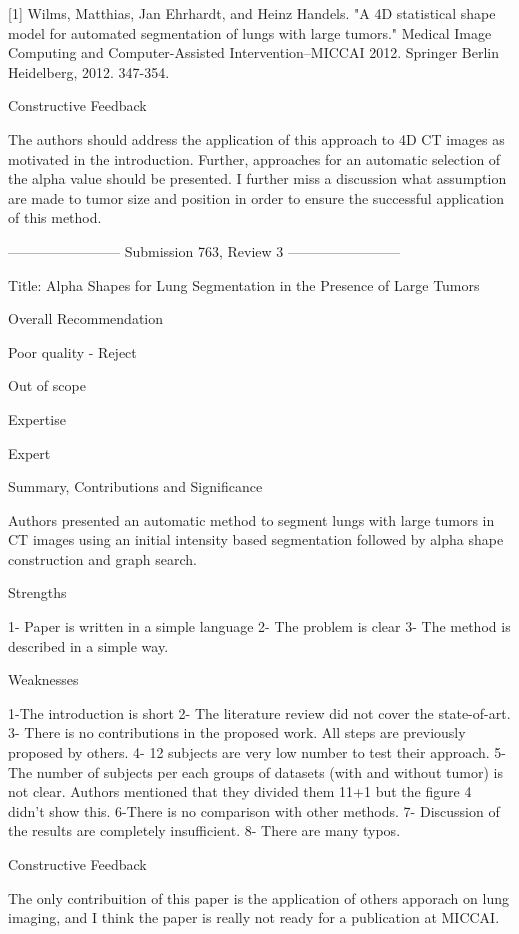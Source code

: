    [1] Wilms, Matthias, Jan Ehrhardt, and Heinz Handels. "A 4D statistical
   shape model for automated segmentation of lungs with large tumors."
   Medical Image Computing and Computer-Assisted Intervention–MICCAI 2012.
   Springer Berlin Heidelberg, 2012. 347-354.

Constructive Feedback

   The authors should address the application of this approach to 4D CT
   images as motivated in the introduction. Further, approaches for an
   automatic selection of the alpha value should be presented.
   I further miss a discussion what assumption are made to tumor size and
   position in order to ensure the successful application of this method.


------------------------ Submission 763, Review 3 ------------------------

Title: Alpha Shapes for Lung Segmentation in the Presence of Large Tumors


Overall Recommendation

   Poor quality - Reject

Out of scope


Expertise

   Expert

Summary, Contributions and Significance

   Authors presented an automatic method to segment lungs with
   large tumors in CT images using an initial intensity based segmentation
   followed by alpha shape construction and graph search.

Strengths

   1- Paper is written in a simple language
   2- The problem is clear
   3- The method is described in a simple way.

Weaknesses

   1-The introduction is short
   2- The literature review did not cover the state-of-art.
   3- There is no contributions in the proposed work. All steps are
   previously proposed by others.
   4- 12 subjects are very low number to test their approach.
   5- The number of subjects per each groups of datasets (with and without
   tumor) is not clear. Authors mentioned that they divided them 11+1 but
   the figure 4 didn't show this.
   6-There is no comparison with other methods.
   7- Discussion of the results are completely insufficient.
   8- There are many typos.

Constructive Feedback

   The only contribuition of this paper is the application of  others
   apporach on lung imaging, and  I think the paper is really not ready for
   a publication at MICCAI.
















